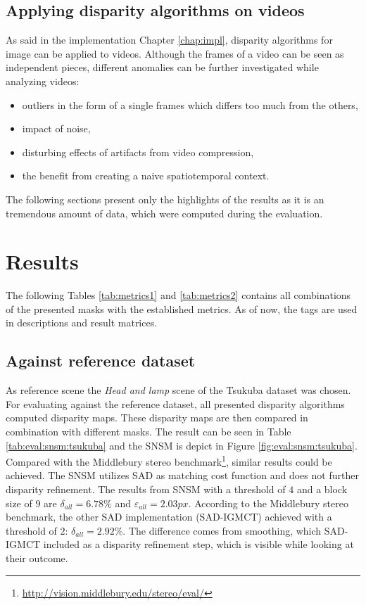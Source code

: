 \subsection*{Applying disparity algorithms on videos}

As said in the implementation Chapter \ref{chap:impl}, disparity algorithms for image can be applied to videos.
Although the frames of a video can be seen as independent pieces, different anomalies can be further investigated while analyzing videos:

\begin{itemize}
  \item outliers in the form of a single frames which differs too much from the others,
  \item impact of noise,
  \item disturbing effects of artifacts from video compression,
  \item the benefit from creating a naive spatiotemporal context.
\end{itemize}

\noindent The following sections present only the highlights of the results as it is an tremendous amount of data, which were computed during the evaluation.

\section{Results}

\noindent The following Tables \ref{tab:metrics1} and \ref{tab:metrics2} contains all combinations of the presented masks with the established metrics.
As of now, the tags are used in descriptions and result matrices.


\subsection{Against reference dataset}

As reference scene the \textit{Head and lamp} scene of the Tsukuba dataset was chosen.
For evaluating against the reference dataset, all presented disparity algorithms computed disparity maps.
These disparity maps are then compared in combination with different masks.
The result can be seen in Table \ref{tab:eval:snsm:tsukuba} and the SNSM is depict in Figure \ref{fig:eval:snsm:tsukuba}.
Compared with the Middlebury stereo benchmark\footnote{\url{http://vision.middlebury.edu/stereo/eval/}}, similar results could be achieved.
The SNSM utilizes SAD as matching cost function and does not further disparity refinement.
The results from SNSM with a threshold of $4$ and a block size of $9$ are $\delta_{all} = 6.78\%$ and $\varepsilon_{all} = 2.03px$.
According to the Middlebury stereo benchmark, the other SAD implementation (SAD-IGMCT) \citep{ambrosch2010accurate} achieved with a threshold of $2$: $\delta_{all} = 2.92\%$.
The difference comes from smoothing, which SAD-IGMCT included as a disparity refinement step, which is visible while looking at their outcome.

